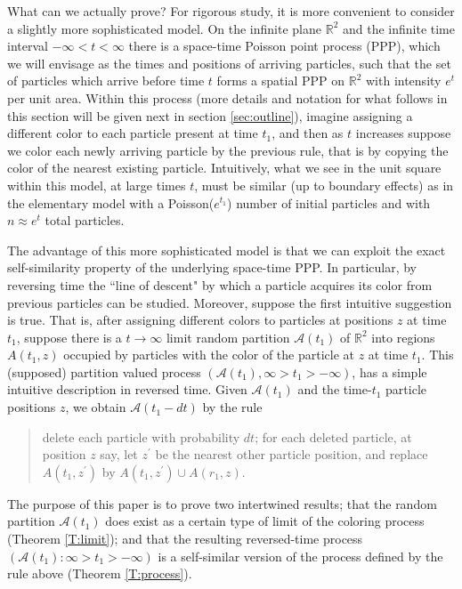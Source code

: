 \documentclass[12pt]{article}
\renewcommand{\AA}{\mbox{${\mathcal A}$}}
\newcommand{\Reals}{{\mathbb{R}}}
\begin{document}
\medskip
What can we actually prove?
For rigorous study, it is more convenient to consider a slightly more sophisticated model. 
On the infinite plane $\Reals^2$ and the infinite time interval $- \infty < t < \infty$ 
there is a space-time  Poisson point process (PPP), which we will envisage as the times and positions of arriving particles, 
such that the set of particles which arrive before time $t$ forms 
a spatial PPP on $\Reals^2$ with intensity $e^t$ per unit area.  
Within this process (more details and notation for what follows in this section will be given next in section \ref{sec:outline}), imagine assigning a different color to each particle present at time $t_1$, 
and then as $t$ increases suppose we color each newly arriving particle by the previous rule, that is by copying the color of the nearest existing particle. 
Intuitively, what we see in the unit square within this model, at large times $t$, must be similar
(up to boundary effects) as in the elementary model with a Poisson($e^{t_1}$) number of initial particles and with $n \approx  e^t$ total particles.


The advantage of this more sophisticated model is that we can exploit the exact self-similarity property of the underlying space-time PPP. 
In particular, by reversing time  the ``line of descent" by which a particle acquires its color from previous particles can be studied.
Moreover, suppose the first intuitive suggestion is true.
That is, after assigning different colors to particles at positions $z$ at time $t_1$, suppose
there is a $t \to \infty$ limit random partition $\AA(t_1)$ of $\Reals^2$ into regions $A(t_1,z)$ occupied by particles with the color of the particle at $z$ at time $t_1$.
This (supposed) partition valued process  $(\AA(t_1),  \infty > t_1 > - \infty)$, has a simple intuitive description in reversed time. 
Given $\AA(t_1)$ and the time-$t_1$ particle positions $z$, we obtain $\AA(t_1 - dt)$ by the rule
\begin{quote}
delete each particle with probability $dt$; for each deleted particle, at position $z$ say, let $z^\prime$ be the nearest other particle
position, and replace $A(t_1,z^\prime)$ by $A(t_1,z^\prime) \cup A(r_1,z)$.
\end{quote}
The purpose of this paper is to prove two intertwined results; 
that the random partition $\AA(t_1)$ does exist as a certain type of limit of the coloring process 
(Theorem \ref{T:limit}); 
and that the resulting reversed-time process $(\AA(t_1) : \infty > t_1 > -\infty)$ is a self-similar version of the process defined by the rule above
(Theorem \ref{T:process}).
\end{document}
